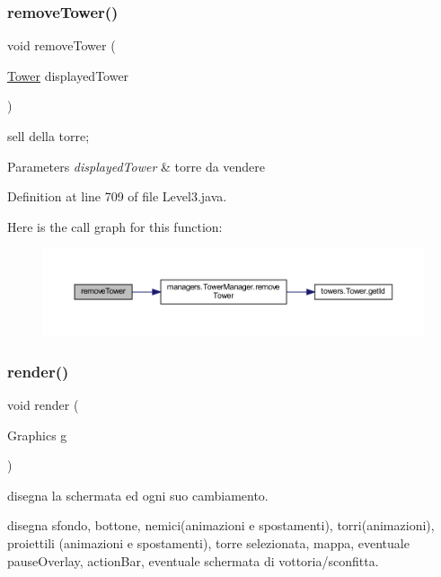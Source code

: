 \subsubsection{\texorpdfstring{remove\+Tower()}{removeTower()}}
{\footnotesize\ttfamily void remove\+Tower (\begin{DoxyParamCaption}\item[{\hyperlink{classtowers_1_1_tower}{Tower}}]{displayed\+Tower }\end{DoxyParamCaption})}



sell della torre; 


\begin{DoxyParams}{Parameters}
{\em displayed\+Tower} & torre da vendere \\
\hline
\end{DoxyParams}


Definition at line 709 of file Level3.\+java.

Here is the call graph for this function\+:\nopagebreak
\begin{figure}[H]
\begin{center}
\leavevmode
\includegraphics[width=350pt]{classscenes_1_1_level3_addba85b44e35a186e066b2e801f433c4_cgraph}
\end{center}
\end{figure}
\mbox{\label{classscenes_1_1_level3_a203b6ad9d5e4d54dd1152986eec4dedc}} 
\subsubsection{\texorpdfstring{render()}{render()}}
{\footnotesize\ttfamily void render (\begin{DoxyParamCaption}\item[{Graphics}]{g }\end{DoxyParamCaption})}



disegna la schermata ed ogni suo cambiamento. 

disegna sfondo, bottone, nemici(animazioni e spostamenti), torri(animazioni), proiettili (animazioni e spostamenti), torre selezionata, mappa, eventuale pause\+Overlay, action\+Bar, eventuale schermata di vottoria/sconfitta.


